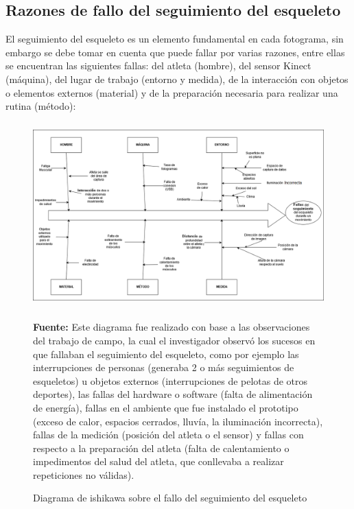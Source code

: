 \begin{landscape}
\section{Razones de fallo del seguimiento del esqueleto}
El seguimiento del esqueleto es un elemento  fundamental en cada fotograma, sin embargo se debe tomar en cuenta que puede fallar por varias razones, entre ellas se encuentran las siguientes fallas: del atleta (hombre), del sensor Kinect (m\'aquina), del lugar de trabajo (entorno y  medida), de la interacci\'on  con objetos o elementos externos (material) y de la preparaci\'on necesaria para realizar una rutina (m\'etodo):
\begin{figure}[H]
	\caption{Diagrama de ishikawa sobre el fallo del seguimiento del esqueleto}
	\label{fig:ishikawa}
	 \begin{center}
	\includegraphics[width=500px,height=270px]{graphics/resultados/Ishi-SeguimientoDeEsqueleto.PNG}	 \\
	\end{center}
	\textbf{Fuente:} Este diagrama fue realizado con base a las observaciones del trabajo de campo, la cual el investigador observ\'o los sucesos en que fallaban el seguimiento del esqueleto, como por ejemplo las interrupciones de personas (generaba 2 o m\'as seguimientos de esqueletos) u objetos externos (interrupciones de pelotas de otros deportes), las fallas del hardware o software (falta de alimentaci\'on de energ\'ia), fallas en el ambiente que fue instalado el prototipo (exceso de calor, espacios cerrados, lluv\'ia, la iluminaci\'on incorrecta), fallas de la medici\'on (posici\'on del atleta o el sensor) y  fallas con respecto a la preparaci\'on del atleta (falta de calentamiento o impedimentos del salud del atleta, que conllevaba a realizar repeticiones no v\'alidas).
\end{figure}
\end{landscape}
